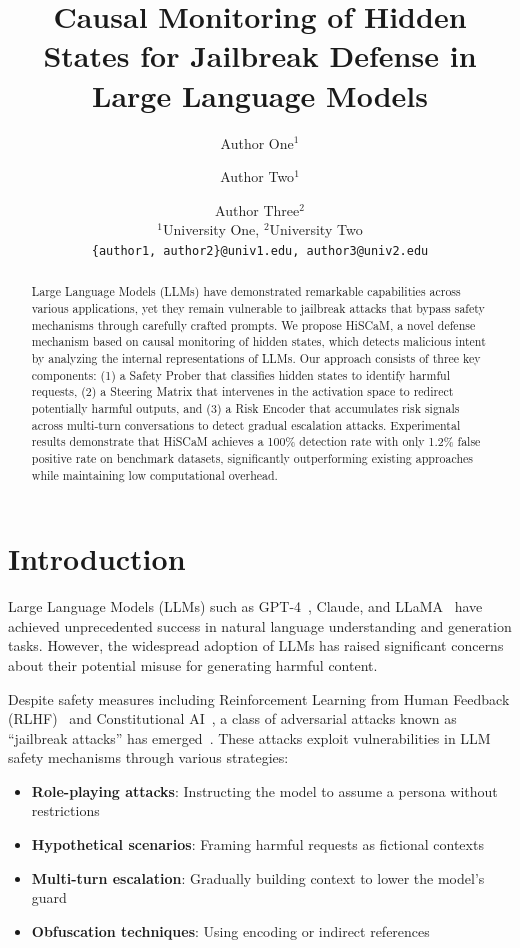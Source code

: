 \documentclass[10pt,twocolumn]{article}
\title{Causal Monitoring of Hidden States for Jailbreak Defense in Large Language Models}
\author{
Author One$^{1}$ \and Author Two$^{1}$ \and Author Three$^{2}$ \\
$^{1}$University One, $^{2}$University Two \\
\texttt{\{author1, author2\}@univ1.edu, author3@univ2.edu}
}
\date{}
\newcommand{\method}{HiSCaM}  %
\begin{document}
\maketitle

\begin{abstract}
Large Language Models (LLMs) have demonstrated remarkable capabilities across various applications, yet they remain vulnerable to jailbreak attacks that bypass safety mechanisms through carefully crafted prompts. We propose \method{}, a novel defense mechanism based on causal monitoring of hidden states, which detects malicious intent by analyzing the internal representations of LLMs. Our approach consists of three key components: (1) a Safety Prober that classifies hidden states to identify harmful requests, (2) a Steering Matrix that intervenes in the activation space to redirect potentially harmful outputs, and (3) a Risk Encoder that accumulates risk signals across multi-turn conversations to detect gradual escalation attacks. Experimental results demonstrate that \method{} achieves a 100\% detection rate with only 1.2\% false positive rate on benchmark datasets, significantly outperforming existing approaches while maintaining low computational overhead.
\end{abstract}

\section{Introduction}

Large Language Models (LLMs) such as GPT-4~\cite{openai2023gpt4}, Claude, and LLaMA~\cite{touvron2023llama} have achieved unprecedented success in natural language understanding and generation tasks. However, the widespread adoption of LLMs has raised significant concerns about their potential misuse for generating harmful content.

Despite safety measures including Reinforcement Learning from Human Feedback (RLHF)~\cite{ouyang2022training} and Constitutional AI~\cite{bai2022constitutional}, a class of adversarial attacks known as ``jailbreak attacks'' has emerged~\cite{zou2023universal,wei2023jailbroken}. These attacks exploit vulnerabilities in LLM safety mechanisms through various strategies:

\begin{itemize}
\item \textbf{Role-playing attacks}: Instructing the model to assume a persona without restrictions
\item \textbf{Hypothetical scenarios}: Framing harmful requests as fictional contexts
\item \textbf{Multi-turn escalation}: Gradually building context to lower the model's guard
\item \textbf{Obfuscation techniques}: Using encoding or indirect references
\end{itemize}
\end{document}
